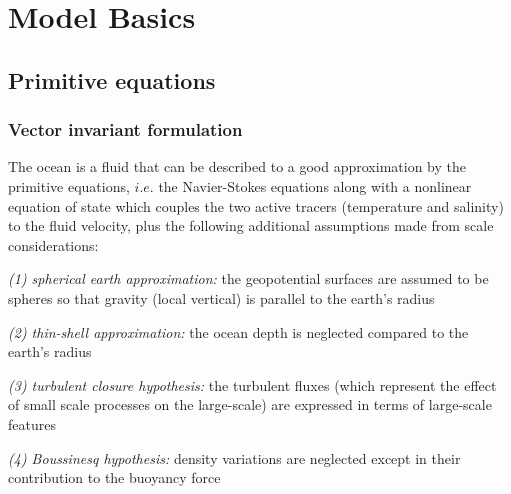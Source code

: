 \documentclass[../main/NEMO_manual]{subfiles}
\begin{document}

\chapter{Model Basics}
\label{chap:PE}

\minitoc

\newpage

\section{Primitive equations}
\label{sec:PE_PE}


\subsection{Vector invariant formulation}
\label{subsec:PE_Vector}


The ocean is a fluid that can be described to a good approximation by the primitive equations,
$i.e.$ the Navier-Stokes equations along with a nonlinear equation of state which
couples the two active tracers (temperature and salinity) to the fluid velocity,
plus the following additional assumptions made from scale considerations:

\textit{(1) spherical earth approximation:} the geopotential surfaces are assumed to be spheres so that
gravity (local vertical) is parallel to the earth's radius

\textit{(2) thin-shell approximation:} the ocean depth is neglected compared to the earth's radius

\textit{(3) turbulent closure hypothesis:} the turbulent fluxes
(which represent the effect of small scale processes on the large-scale) are expressed in terms of
large-scale features

\textit{(4) Boussinesq hypothesis:} density variations are neglected except in their contribution to
the buoyancy force
\end{document}
